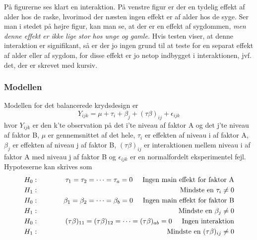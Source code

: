 \documentclass[11pt]{article}
\begin{document}
På figurerne ses klart en interaktion. På venstre figur er der en tydelig effekt af alder hos de raske, hvorimod der næsten ingen effekt er af alder hos de syge. Ser man i stedet på højre figur, kan man se, at der er en effekt af sygdommen,\textit{ men denne effekt er ikke lige stor hos unge og gamle.} Hvis testen viser, at denne interaktion er signifikant, så er der jo ingen grund til at teste for en separat effekt af alder eller af sygdom, for disse effekt er jo netop indbygget i interaktionen, jvf. det, der er skrevet med kursiv.

\subsubsection{Modellen}
Modellen for det balancerede krydsdesign er
$$Y_{ijk}=\mu+\tau_i+\beta_j+(\tau\beta)_{ij}+\epsilon_{ijk}$$
hvor $Y_{ijk}$ er den k'te observation på det i'te niveau af faktor A og det j'te niveau af faktor B, $\mu$ er gennemsnittet af det hele, $\tau_i$ er effekten af niveau i af faktor A, $\beta_j$ er effekten af niveau j af faktor B, $(\tau\beta)_{ij}$ er interaktionen mellem niveau i af faktor A med niveau j af faktor B og $\epsilon_{ijk}$ er en normalfordelt eksperimentel fejl.\\[0.2cm]
Hypoteserne kan skrives som
\begin{eqnarray*}
H_0&:&\hspace{1cm}\tau_1=\tau_2=\cdots=\tau_a=0\hspace{0.5cm}\text{Ingen main effekt for faktor A}\\
H_1&:&\hspace{1cm}\text{Mindste en }\tau_i\neq 0\\
H_0&:&\hspace{1cm}\beta_1=\beta_2=\cdots=\beta_b=0\hspace{0.5cm}\text{Ingen main effekt for faktor B}\\
H_1&:&\hspace{1cm}\text{Mindste en }\beta_j\neq 0\\
H_0&:&\hspace{1cm}(\tau\beta)_{11}=(\tau\beta)_{12}=\cdots=(\tau\beta)_{ab}=0\hspace{0.5cm}\text{Ingen interaktion}\\
H_1&:&\hspace{1cm}\text{Mindste en }(\tau\beta)_{ij}\neq 0
\end{eqnarray*}
\end{document}
